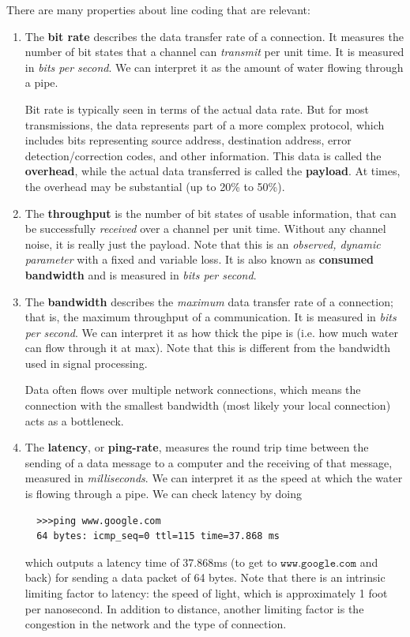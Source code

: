 \documentclass{article}
\newcounter{definition}[section]
\newcounter{code}[section]
\begin{document}
  \begin{definition}
    \label{def:bit-rate-bandwidth-and-latency}
  There are many properties about line coding that are relevant:
  \begin{enumerate}
      \item The \textbf{bit rate} describes the data transfer rate of a connection. It measures the number of bit states that a channel can \textit{transmit} per unit time. It is measured in \textit{bits per second}. We can interpret it as the amount of water flowing through a pipe. 
      
      Bit rate is typically seen in terms of the actual data rate. But for most transmissions, the data represents part of a more complex protocol, which includes bits representing source address, destination address, error detection/correction codes, and other information. This data is called the \textbf{overhead}, while the actual data transferred is called the \textbf{payload}. At times, the overhead may be substantial (up to 20\% to 50\%). 

      \item The \textbf{throughput} is the number of bit states of usable information, that can be successfully \textit{received} over a channel per unit time. Without any channel noise, it is really just the payload. Note that this is an \textit{observed, dynamic parameter} with a fixed and variable loss. It is also known as \textbf{consumed bandwidth} and is measured in \textit{bits per second}. 
      
      \item The \textbf{bandwidth} describes the \textit{maximum} data transfer rate of a connection; that is, the maximum throughput of a communication. It is measured in \textit{bits per second}. We can interpret it as how thick the pipe is (i.e. how much water can flow through it at max). Note that this is different from the bandwidth used in signal processing. 
      
      Data often flows over multiple network connections, which means the connection with the smallest bandwidth (most likely your local connection) acts as a bottleneck. 
      
      \item The \textbf{latency}, or \textbf{ping-rate}, measures the round trip time between the sending of a data message to a computer and the receiving of that message, measured in \textit{milliseconds}. We can interpret it as the speed at which the water is flowing through a pipe. We can check latency by doing
      \begin{lstlisting}
  >>>ping www.google.com
  64 bytes: icmp_seq=0 ttl=115 time=37.868 ms
      \end{lstlisting}
      which outputs a latency time of 37.868ms (to get to $\texttt{www.google.com}$ and back) for sending a data packet of 64 bytes. Note that there is an intrinsic limiting factor to latency: the speed of light, which is approximately 1 foot per nanosecond. In addition to distance, another limiting factor is the congestion in the network and the type of connection. 
  \end{enumerate}
  \end{definition}
\end{document}
